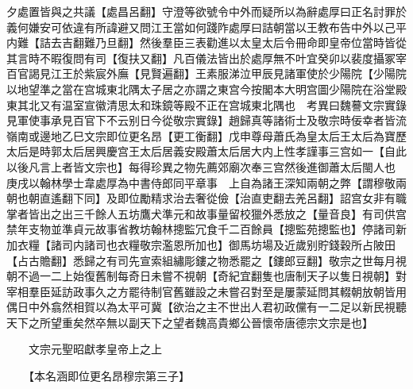 夕處置皆與之共議【處昌呂翻】守澄等欲號令中外而疑所以為辭處厚曰正名討罪於義何嫌安可依違有所諱避又問江王當如何踐阼處厚曰詰朝當以王教布告中外以己平内難【詰去吉翻難乃旦翻】然後羣臣三表勸進以太皇太后令冊命即皇帝位當時皆從其言時不暇復問有司【復扶又翻】凡百儀法皆出於處厚無不叶宜癸卯以裴度攝冢宰百官謁見江王於紫宸外廡【見賢遍翻】王素服涕泣甲辰見諸軍使於少陽院【少陽院以地望準之當在宫城東北隅太子居之亦謂之東宫今按閣本大明宫圖少陽院在浴堂殿東其北又有温室宣徽清思太和珠鏡等殿不正在宫城東北隅也　考異曰魏謩文宗實錄見軍使事承見百官下不云别日今從敬宗實錄】趙歸真等諸術士及敬宗時佞幸者皆流嶺南或邊地乙巳文宗即位更名昂【更工衡翻】戊申尊母蕭氏為皇太后王太后為寶歷太后是時郭太后居興慶宫王太后居義安殿蕭太后居大内上性孝謹事三宫如一【自此以後凡言上者皆文宗也】每得珍異之物先薦郊廟次奉三宫然後進御蕭太后閩人也　庚戌以翰林學士韋處厚為中書侍郎同平章事　上自為諸王深知兩朝之弊【謂穆敬兩朝也朝直遙翻下同】及即位勵精求治去奢從儉【治直吏翻去羌呂翻】詔宫女非有職掌者皆出之出三千餘人五坊鷹犬準元和故事量留校獵外悉放之【量音良】有司供宫禁年支物並準貞元故事省教坊翰林摠監冗食千二百餘員【摠監苑摠監也】停諸司新加衣糧【諸司内諸司也衣糧敬宗濫恩所加也】御馬坊場及近歲别貯錢穀所占陂田【占古贍翻】悉歸之有司先宣索組繡彫鏤之物悉罷之【鏤郎豆翻】敬宗之世每月視朝不過一二上始復舊制每奇日未嘗不視朝【奇紀宜翻隻也唐制天子以隻日視朝】對宰相羣臣延訪政事久之方罷待制官舊雖設之未嘗召對至是屢蒙延問其輟朝放朝皆用偶日中外翕然相賀以為太平可冀【欲治之主不世出人君初政儻有一二足以新民視聽天下之所望重矣然卒無以副天下之望者魏高貴鄉公晉懷帝唐德宗文宗是也】

　　文宗元聖昭獻孝皇帝上之上

　　【本名涵即位更名昂穆宗第三子】

